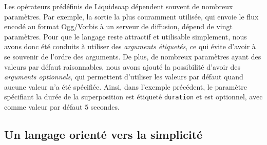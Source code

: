 \documentclass[twoside]{article}
\newcommand{\liquidsoap}{Liquidsoap}
\theoremstyle{plain}
\theoremstyle{definition}
\theoremstyle{remark}
\begin{document}
Les opérateurs prédéfinis de \liquidsoap{} dépendent souvent de nombreux
paramètres. Par exemple, la sortie la plus couramment utilisée, qui
envoie le flux encodé au format Ogg/Vorbis à un serveur de diffusion,
dépend de vingt paramètres.
Pour que le langage reste attractif
et utilisable simplement, nous avons donc été conduits à utiliser des
\emph{arguments étiquetés}, ce qui évite d'avoir à
se souvenir de l'ordre des arguments. De plus, de nombreux paramètres ayant des
valeurs par défaut raisonnables, nous avons ajouté la possibilité d'avoir des
\emph{arguments optionnels}, qui permettent d'utiliser les valeurs par défaut
quand aucune valeur n'a été spécifiée.
Ainsi, dans l'exemple précédent, le paramètre spécifiant la durée de la 
superposition est étiqueté \verb.duration. et est optionnel, avec comme valeur 
par défaut $5$ secondes.

\subsection{Un langage orienté vers la simplicité}
\end{document}

